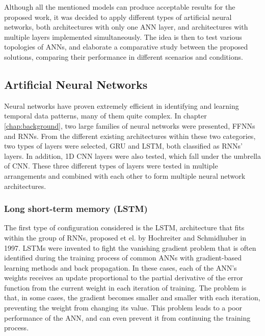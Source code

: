 Although all the mentioned models can produce acceptable results for the proposed work, it was decided to apply different types of artificial neural networks, both architectures with only one \ac{ANN} layer, and architectures with multiple layers implemented simultaneously. The idea is then to test various topologies of \ac{ANN}s, and elaborate a comparative study between the proposed solutions, comparing their performance in different scenarios and conditions.

\subsection{Artificial Neural Networks}\label{chap3:subsec:artificial_neural_networks}

Neural networks have proven extremely efficient in identifying and learning temporal data patterns, many of them quite complex. In chapter \ref{chap:background}, two large families of neural networks were presented, \ac{FFNN}s and \ac{RNN}s. From the different existing architectures within these two categories, two types of layers were selected, \ac{GRU} and \ac{LSTM}, both classified as \ac{RNN}s' layers. In addition, \ac{1D CNN} layers were also tested, which fall under the umbrella of \ac{CNN}. These three different types of layers were tested in multiple arrangements and combined with each other to form multiple neural network architectures.

\subsubsection{Long short-term memory (LSTM)}\label{chap3:subsubsec:lstm}

The first type of configuration considered is the \ac{LSTM}, architecture that fits within the group of \ac{RNN}s, proposed et el. \cite{lstm0} by Hochreiter and Schmidhuber in 1997.
\ac{LSTM}s were invented to fight the vanishing gradient problem that is often identified during the training process of common \ac{ANN}s with gradient-based learning methods and back propagation. In these cases, each of the \ac{ANN}'s weights receives an update proportional to the partial derivative of the error function from the current weight in each iteration of training. The problem is that, in some cases, the gradient becomes smaller and smaller with each iteration, preventing the weight from changing its value. This problem leads to a poor performance of the \ac{ANN}, and can even prevent it from continuing the training process.

